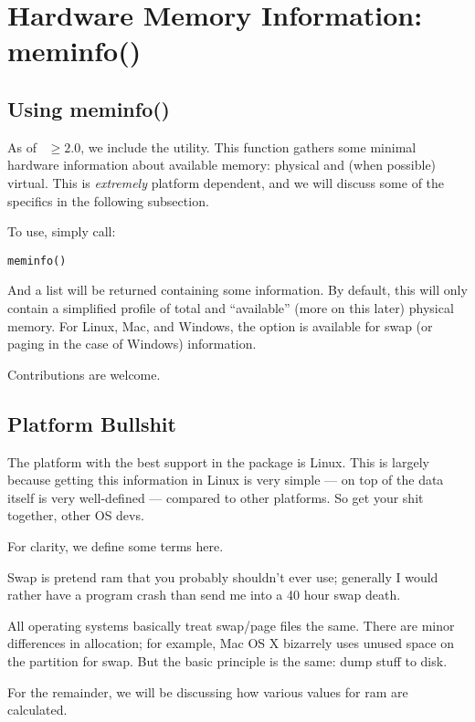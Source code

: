 \section{Hardware Memory Information: meminfo()}

\subsection{Using meminfo()}

As of ~$\geq 2.0$, we include the  utility.  This function gathers some minimal hardware information about available memory: physical and (when possible) virtual.  This is \emph{extremely} platform dependent, and we will discuss some of the specifics in the following subsection.  

To use, simply call:
\begin{lstlisting}
meminfo()
\end{lstlisting}

And a list will be returned containing some information.  By default, this will only contain a simplified profile of total and ``available'' (more on this later) physical memory.  For Linux, Mac, and Windows, the option is available for swap (or paging in the case of Windows) information.  

Contributions are welcome.



\subsection{Platform Bullshit}

The platform with the best support in the  package is Linux.  This is largely 
because getting this information in Linux is very simple --- on top of the data itself is 
very well-defined --- compared to other platforms.  So get your shit together, other OS devs.

For clarity, we define some terms here.

Swap is pretend ram that you probably shouldn't ever use; generally I would rather have a program crash than send me into a 40 hour swap death.

All operating systems basically treat swap/page files the same.  There are minor differences in allocation; for example, Mac OS X bizarrely uses unused space on the  partition for swap.  But the basic principle is the same: dump stuff to disk.

For the remainder, we will be discussing how various values for ram are calculated.



